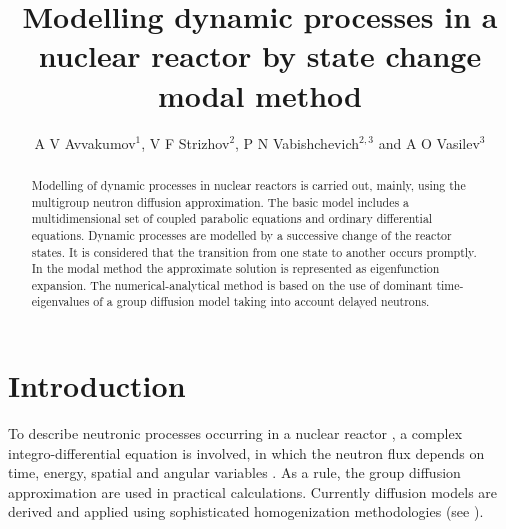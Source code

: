 \documentclass[a4paper]{jpconf}
\begin{document}
\title{Modelling dynamic processes in a nuclear reactor by state change modal method}

\author{A V Avvakumov$^1$, V F Strizhov$^2$, P N Vabishchevich$^{2,3}$ and A O Vasilev$^3$}

\address{$^1$ National Research Center Kurchatov Institute, Moscow, Russia}
\address{$^2$ Nuclear Safety Institute of RAS, Moscow, Russia}
\address{$^3$ North-Eastern Federal University, Yakutsk, Russia}


\begin{abstract}
Modelling of dynamic processes in nuclear reactors is carried out, mainly, using the multigroup neutron diffusion approximation. 
The basic model includes a multidimensional set of coupled parabolic equations and ordinary differential equations.
Dynamic processes are modelled by a successive
change of the reactor states. It is considered that the transition from one state to another occurs promptly.
In the modal method the approximate solution is represented as eigenfunction expansion. 
The numerical-analytical method is based on the use of dominant time-eigenvalues of
a group diffusion model taking into account delayed neutrons. 
\end{abstract}

\section{Introduction}
To describe neutronic processes occurring in a nuclear reactor  \cite{duderstadt1976nuclear}, a complex integro-differential equation is involved, in which the neutron flux depends on time, energy, spatial and angular variables  \cite{stacey}. As a rule,  the group diffusion  approximation  are used  \cite{marchuk1986numerical} in practical calculations.
Currently diffusion models are derived and applied using sophisticated homogenization methodologies (see \cite{sanchez2009assembly}). 
\end{document}
